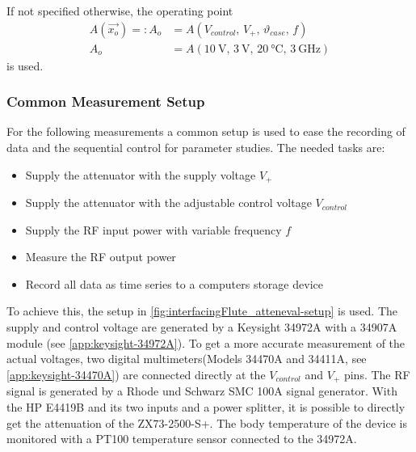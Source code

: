 If not specified otherwise, the operating point
\begin{align}\label{eq:interfacingFlute_operatingpoint}
A(\vec{x_o}) =: A_o &= A(V_{control},\,V_+,\,\vartheta_{case},\,f)\\
A_o                 &= A\left(\SI{10}{\volt},\,\SI{3}{\volt},\,\SI{20}{\celsius},\,\SI{3}{\GHz}\right)
\end{align}
is used.

\subsubsection{Common Measurement Setup}
For the following measurements a common setup is used to ease the recording of data and the sequential control for parameter studies. The needed tasks are:
\begin{itemize}
\item Supply the attenuator with the supply voltage $V_+$
\item Supply the attenuator with the adjustable control voltage $V_{control}$
\item Supply the RF input power with variable frequency $f$
\item Measure the RF output power
\item Record all data as time series to a computers storage device
\end{itemize}

To achieve this, the setup in \autoref{fig:interfacingFlute_atteneval-setup} is used.
The supply and control voltage are generated by a Keysight 34972A with a 34907A module (see \autoref{app:keysight-34972A}).
To get a more accurate measurement of the actual voltages, two digital multimeters(Models 34470A and 34411A, see \autoref{app:keysight-34470A}) are connected directly at the $V_{control}$ and $V_+$ pins.
The RF signal is generated by a Rhode und Schwarz SMC 100A signal generator.
With the HP E4419B and its two inputs and a power splitter, it is possible to directly get the attenuation of the ZX73-2500-S+.
The body temperature of the device is monitored with a PT100 temperature sensor connected to the 34972A.

